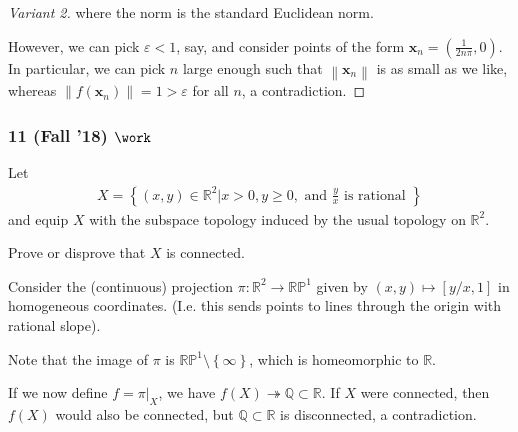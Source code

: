 \begin{solution}
\begin{proof}[Variant 2]
where the norm is the standard Euclidean norm.

However, we can pick \(\varepsilon < 1\), say, and consider points of
the form \(\mathbf{x}_n = (\frac{1}{2n\pi}, 0)\). In particular, we can
pick \(n\) large enough such that
\({\left\lVert {\mathbf{x}_n} \right\rVert}\) is as small as we like,
whereas
\({\left\lVert {f(\mathbf{x}_n)} \right\rVert} = 1 > \varepsilon\) for
all \(n\), a contradiction.

\end{proof}

\end{solution}

\hypertarget{fall-18-work-1}{%
\subsubsection{\texorpdfstring{11 (Fall '18)
\(\work\)}{11 (Fall '18) \textbackslash work}}\label{fall-18-work-1}}

\begin{problem}[?]

Let
\begin{align*} X=\left\{(x, y) \in \mathbb{R}^{2} | x>0, y \geq 0, \text { and } \frac{y}{x} \text { is rational }\right\} \end{align*}
and equip \(X\) with the subspace topology induced by the usual topology
on \({\mathbb{R}}^2\).

Prove or disprove that \(X\) is connected.

\end{problem}


\begin{solution}

\envlist

\begin{concept}

\envlist

\end{concept}

Consider the (continuous) projection
\(\pi: {\mathbb{R}}^2 \to {\mathbb{RP}}^1\) given by
\((x, y) \mapsto [y/x, 1]\) in homogeneous coordinates. (I.e. this sends
points to lines through the origin with rational slope).

Note that the image of \(\pi\) is
\({\mathbb{RP}}^1\setminus\left\{{\infty}\right\}\), which is
homeomorphic to \({\mathbb{R}}\).

If we now define \(f = {\left.{{\pi}} \right|_{{X}} }\), we have
\(f(X) \twoheadrightarrow{\mathbb{Q}}\subset {\mathbb{R}}\). If \(X\)
were connected, then \(f(X)\) would also be connected, but
\({\mathbb{Q}}\subset {\mathbb{R}}\) is disconnected, a contradiction.

\end{solution}

